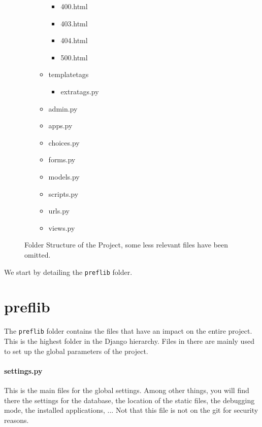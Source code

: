 \documentclass{report}
\begin{document}
\begin{figure}
\begin{multicols}{2}
\begin{itemize}
\begin{itemize}
\begin{itemize}
						\item[\faFileO] 400.html
						\item[\faFileO] 403.html
						\item[\faFileO] 404.html
						\item[\faFileO] 500.html
					\end{itemize}
					\item[\faFolderO] templatetags
					\begin{itemize}
						\item[\faFileO] extratags.py
					\end{itemize}
					\item[\faFileO] admin.py
					\item[\faFileO] apps.py
					\item[\faFileO] choices.py
					\item[\faFileO] forms.py
					\item[\faFileO] models.py
					\item[\faFileO] scripts.py
					\item[\faFileO] urls.py
					\item[\faFileO] views.py
				\end{itemize}
			\end{itemize}
		\end{multicols}
		\caption{Folder Structure of the Project, some less relevant files have been omitted.}
		\label{fig:folderStruct}
	\end{figure}

	\medskip

	We start by detailing the \texttt{preflib} folder.

	\section*{\faFolderO{}  preflib}
	
	The \texttt{preflib} folder contains the files that have an impact on the entire project. This is the highest folder in the Django hierarchy. Files in there are mainly used to set up the global parameters of the project.
	
	\paragraph*{\faFileO{} settings.py} This is the main files for the global settings. Among other things, you will find there the settings for the database, the location of the static files, the debugging mode, the installed applications, ... Not that this file is not on the git for security reasons.
	
\end{document}
